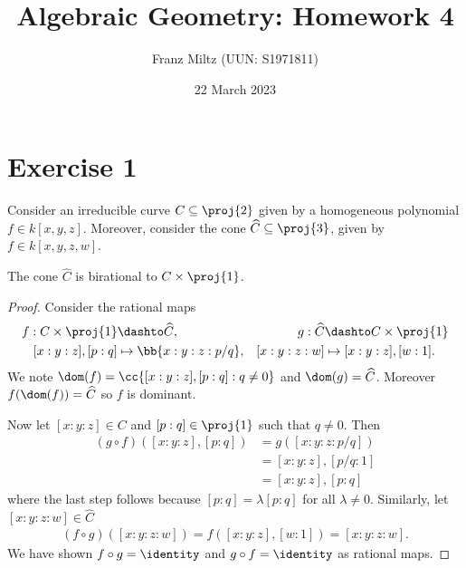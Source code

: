 \documentclass{article}
\begin{document}
\title{Algebraic Geometry: Homework 4}
\author{Franz Miltz (UUN: S1971811)}
\date{22 March 2023}
\maketitle

\section*{Exercise 1}

Consider an irreducible curve $C\subseteq\proj{2}$ given by a homogeneous polynomial
$f\in k[x,y,z]$. Moreover, consider the cone $\widehat C\subseteq\proj{3}$,
given by $f\in k[x,y,z,w]$.

\begin{claim*}[1]
  The cone $\widehat C$ is birational to $C\times\proj{1}$.
  \begin{proof}
    Consider the rational maps
    \begin{align*}
      f: C\times\proj{1} &\dashto \widehat C, &
      g : \widehat C &\dashto C\times\proj{1} \\
      [x : y : z], [p:q] &\mapsto \bb{x:y:z:p/q}, &
      [x:y:z:w] &\mapsto [x:y:z], [w : 1].
    \end{align*}
    We note $\dom(f) = \cc{[x:y:z],[p:q] : q\neq 0}$ and $\dom(g) = \widehat C$.
    Moreover $f(\dom(f)) = \widehat C$ so $f$ is dominant.

    Now let $[x:y:z]\in C$ and $[p:q]\in\proj{1}$ such that $q\neq 0$. Then
    \begin{align*}
      (g\circ f)([x:y:z],[p:q]) &= g([x:y:z:p/q]) \\
                                &= [x:y:z],[p/q:1]\\
                                &= [x:y:z],[p:q]
    \end{align*}
    where the last step follows because $[p:q] = \lambda[p:q]$ for all $\lambda\neq 0$.
    Similarly, let $[x:y:z:w]\in\widehat C$
    \begin{align*}
      (f\circ g)([x:y:z:w]) = f([x:y:z],[w:1]) = [x:y:z:w].
    \end{align*}
    We have shown $f\circ g = \identity$ and $g\circ f=\identity$ as rational maps.
  \end{proof}
\end{claim*}
\end{document}
